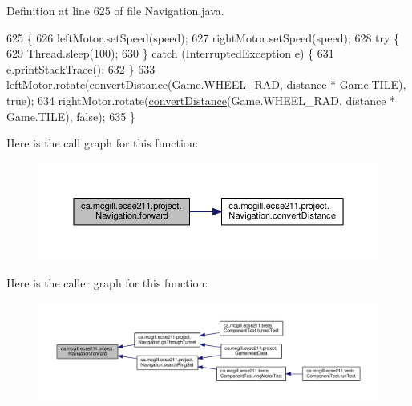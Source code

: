 Definition at line 625 of file Navigation.\+java.


\begin{DoxyCode}
625                                                   \{
626     leftMotor.setSpeed(speed);
627     rightMotor.setSpeed(speed);
628     \textcolor{keywordflow}{try} \{
629       Thread.sleep(100);
630     \} \textcolor{keywordflow}{catch} (InterruptedException e) \{
631       e.printStackTrace();
632     \}
633     leftMotor.rotate(\hyperlink{classca_1_1mcgill_1_1ecse211_1_1project_1_1_navigation_ac9e260bcd619ffa4820d7d0de7ea1c12}{convertDistance}(Game.WHEEL\_RAD, distance * Game.TILE), \textcolor{keyword}{true});
634     rightMotor.rotate(\hyperlink{classca_1_1mcgill_1_1ecse211_1_1project_1_1_navigation_ac9e260bcd619ffa4820d7d0de7ea1c12}{convertDistance}(Game.WHEEL\_RAD, distance * Game.TILE), \textcolor{keyword}{false});
635   \}
\end{DoxyCode}
Here is the call graph for this function\+:\nopagebreak
\begin{figure}[H]
\begin{center}
\leavevmode
\includegraphics[width=350pt]{classca_1_1mcgill_1_1ecse211_1_1project_1_1_navigation_a7c66610c5b7496ddb35d342ab2cd3f08_cgraph}
\end{center}
\end{figure}
Here is the caller graph for this function\+:\nopagebreak
\begin{figure}[H]
\begin{center}
\leavevmode
\includegraphics[width=350pt]{classca_1_1mcgill_1_1ecse211_1_1project_1_1_navigation_a7c66610c5b7496ddb35d342ab2cd3f08_icgraph}
\end{center}
\end{figure}
\mbox{\label{classca_1_1mcgill_1_1ecse211_1_1project_1_1_navigation_a4b52e605d3ea2f9bcd9481ae2c69ba39}} 
